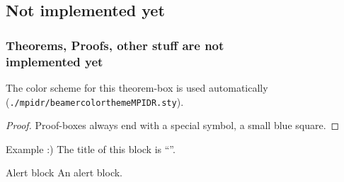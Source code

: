 \documentclass[aspectratio=169]{beamer}
\begin{document}


\subsection{Not implemented yet} 

\begin{frame}[mpidrbackground=4] %
    \frametitle{Theorems, Proofs, other stuff are not \\ implemented yet}
   \begin{theorem}
      The color scheme for this theorem-box is used automatically {\upshape(\texttt{./mpidr/beamercolorthemeMPIDR.sty})}.
   \end{theorem}

   \begin{proof}
      Proof-boxes always end with a special symbol, a small blue square.
   \end{proof}

   \begin{block}{Example :)}
      The title of this block is ``\insertblocktitle''.
   \end{block}

   \begin{alertblock}{Alert block}
      An alert block.
   \end{alertblock}


\end{frame}
\end{document}
